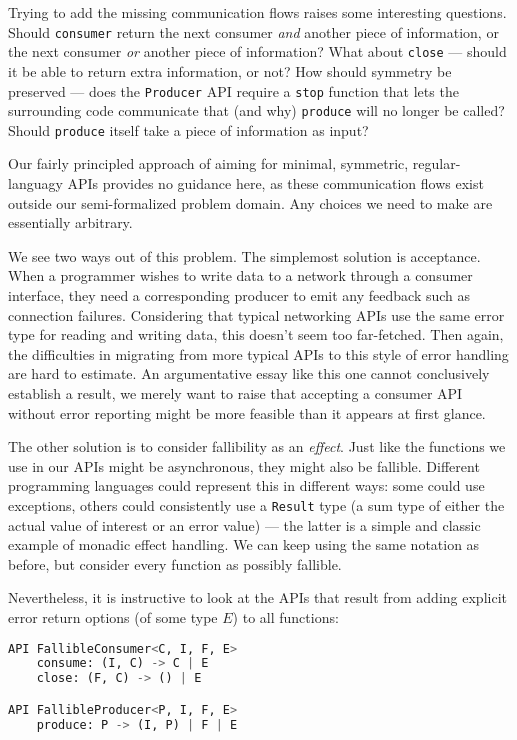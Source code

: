 \documentclass[sigplan,screen,10pt,review]{acmart}
\begin{document}
Trying to add the missing communication flows raises some interesting questions. Should \texttt{consumer} return the next consumer \textit{and} another piece of information, or the next consumer \textit{or} another piece of information? What about \texttt{close} --- should it be able to return extra information, or not? How should symmetry be preserved --- does the \texttt{Producer} API require a \texttt{stop} function that lets the surrounding code communicate that (and why) \texttt{produce} will no longer be called? Should \texttt{produce} itself take a piece of information as input?

Our fairly principled approach of aiming for  minimal, symmetric, regular-languagy APIs provides no guidance here, as these communication flows exist outside our semi-formalized problem domain. Any choices we need to make are essentially arbitrary.

We see two ways out of this problem. The simplemost solution is acceptance. When a programmer wishes to write data to a network through a consumer interface, they need a corresponding producer to emit any feedback such as connection failures. Considering that typical networking APIs use the same error type for reading and writing data, this doesn't seem too far-fetched. Then again, the difficulties in migrating from more typical APIs to this style of error handling are hard to estimate. An argumentative essay like this one cannot conclusively establish a result, we merely want to raise that accepting a consumer API without error reporting might be more feasible than it appears at first glance.

The other solution is to consider fallibility as an \textit{effect}. Just like the functions we use in our APIs might be asynchronous, they might also be fallible. Different programming languages could represent this in different ways: some could use exceptions, others could consistently use a \texttt{Result} type (a sum type of either the actual value of interest or an error value) --- the latter is a simple and classic example of monadic effect handling. We can keep using the same notation as before, but consider every function as possibly fallible.

Nevertheless, it is instructive to look at the APIs that result from adding explicit error return options (of some type $E$) to all functions:

\begin{lstlisting}[language=Python]
API FallibleConsumer<C, I, F, E>
    consume: (I, C) -> C | E
    close: (F, C) -> () | E

API FallibleProducer<P, I, F, E>
    produce: P -> (I, P) | F | E
\end{lstlisting}
\end{document}
